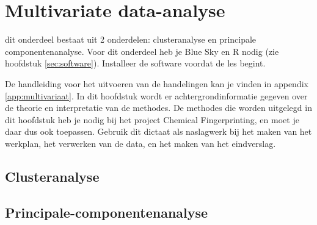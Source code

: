 \chapter{Multivariate data-analyse}
dit onderdeel bestaat uit 2 onderdelen: clusteranalyse en principale componentenanalyse. Voor dit onderdeel heb je Blue Sky en R nodig (zie hoofdstuk \ref{sec:software}). Installeer de software voordat de les begint.

De handleiding voor het uitvoeren van de handelingen kan je vinden in appendix \ref{app:multivariaat}. In dit hoofdstuk wordt er achtergrondinformatie gegeven over de theorie en interpretatie van de methodes. 
De methodes die worden uitgelegd in dit hoofdstuk heb je nodig bij het project Chemical Fingerprinting, en moet je daar dus ook toepassen. Gebruik dit dictaat als naslagwerk bij het maken van het werkplan, het verwerken van de data, en het maken van het eindverslag. 

\section{Clusteranalyse}

\section{Principale-componentenanalyse}